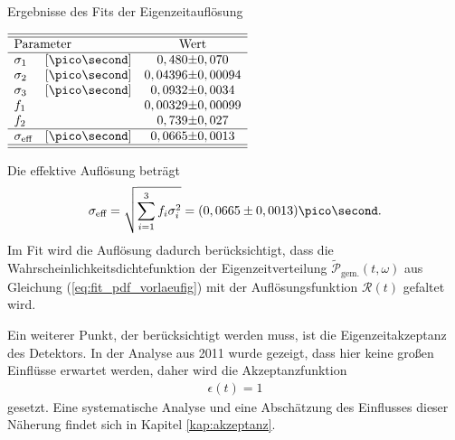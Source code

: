 \begin{table}[hptb]
\centering
\caption{Ergebnisse des Fits der Eigenzeitauflösung}
\label{tab:resolution}
$\begin{array}{ll r@{\pm}l}
\hline 
\hline
\multicolumn{2}{l}{\text{Parameter}} & \multicolumn{2}{c}{\text{Wert}}\\
\hline
\sigma_{1}& [\ps] & 0,480 & 0,070 \\
\sigma_{2}& [\ps] & 0,04396 & 0,00094 \\
\sigma_{3}& [\ps] & 0,0932 & 0,0034 \\
f_{1} & & 0,00329 & 0,00099\\
f_{2} & & 0,739 & 0,027\\ \hline
\sigma_{\text{eff}}& [\ps] & 0,0665 & 0,0013 \\ \hline \hline
\end{array}$   
\end{table}
Die effektive Auflösung beträgt
\begin{align}
\sigma_{\text{eff}} = \sqrt{\sum_{i=1}^3 f_i \sigma_i^2} = (0,0665\pm 0,0013)\ps.
\end{align}
Im Fit wird die Auflösung dadurch berücksichtigt, dass die Wahrscheinlichkeitsdichtefunktion der Eigenzeitverteilung $\widetilde{\mathcal{P}}_{\text{gem.}}(t, \omega)$ aus Gleichung (\ref{eq:fit_pdf_vorlaeufig}) mit der Auflösungsfunktion $\mathcal{R}(t)$ gefaltet wird. 

Ein weiterer Punkt, der berücksichtigt werden muss, ist die Eigenzeitakzeptanz des Detektors. In der Analyse aus 2011 \cite{lhcb-paper} wurde gezeigt, dass hier keine großen Einflüsse erwartet werden, daher wird die Akzeptanzfunktion 
\begin{align}
\epsilon(t) = 1
\end{align}
gesetzt. Eine systematische Analyse und eine Abschätzung des Einflusses dieser Näherung findet sich in Kapitel \ref{kap:akzeptanz}.


